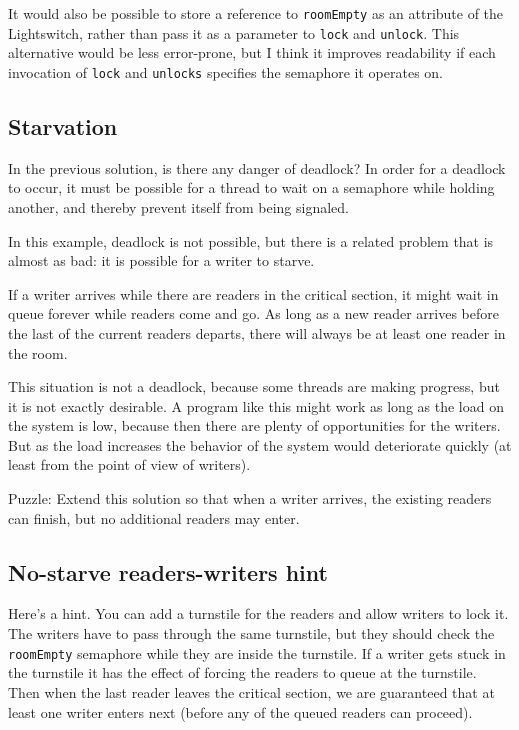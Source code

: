\documentclass{book}
\begin{document}
It would also be possible to store a reference to {\tt roomEmpty}
as an attribute of the Lightswitch, rather than pass it as a parameter
to {\tt lock} and {\tt unlock}.  This alternative would be less
error-prone, but I think it improves readability if each invocation
of {\tt lock} and {\tt unlocks} specifies the semaphore it operates on.

\subsection{Starvation}

In the previous solution, is there any danger of deadlock?
In order for a deadlock to occur, it must be possible for a
thread to wait on a semaphore while holding another, and thereby
prevent itself from being signaled.

In this example, deadlock is not possible, but there is a related
problem that is almost as bad: it is possible for a writer to
starve.

If a writer arrives while there are readers in the critical section,
it might wait in queue forever while readers come and go.  As long
as a new reader arrives before the last of the current readers
departs, there will always be at least one reader in the room.

This situation is not a deadlock, because some threads are making
progress, but it is not exactly desirable.  A program like this
might work as long as the load on the system is low, because then there
are plenty of opportunities for the writers.  But as the load
increases the behavior of the system would deteriorate quickly
(at least from the point of view of writers).

Puzzle: Extend this solution so that when a writer arrives,
the existing readers can finish, but no additional readers
may enter.



\subsection {No-starve readers-writers hint}

Here's a hint.  You can add a turnstile for the readers and
allow writers to lock it.  The writers have to pass through
the same turnstile, but they should check the {\tt roomEmpty}
semaphore while they are inside the turnstile.  If a writer
gets stuck in the turnstile it has the effect of forcing the
readers to queue at the turnstile.  Then when the last reader
leaves the critical section, we are guaranteed that at least
one writer enters next (before any of the queued readers can
proceed).
\end{document}
